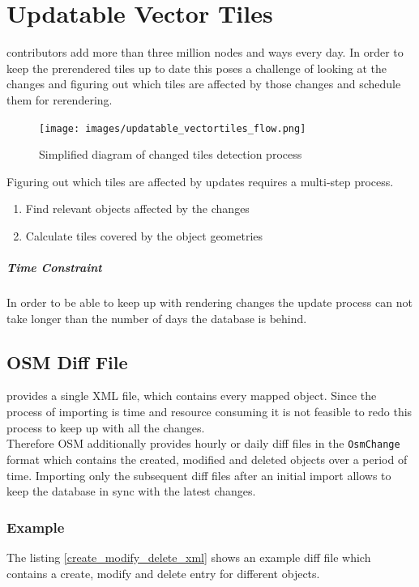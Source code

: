 \chapter{Updatable Vector Tiles}\label{chapter_updatable_vector_tiles}


\osm{} contributors add more than three million nodes and ways every day.
In order to keep the prerendered tiles up to date this poses a challenge of looking at the changes
and figuring out which tiles are affected by those changes and schedule them for rerendering.

\begin{figure}[H]
  \centering
  \texttt{[image: images/updatable\_vectortiles\_flow.png]}
  \caption{Simplified diagram of changed tiles detection process}
\end{figure}

Figuring out which tiles are affected by updates requires a multi-step process.

\begin{enumerate}
    \item Find relevant \osm{} objects affected by the changes
    \item Calculate tiles covered by the object geometries
\end{enumerate}

\paragraph{Time Constraint} In order to be able to keep up with rendering changes the update process can not take longer than the number of days the database is behind.

\section{OSM Diff File}

\osm{} provides a single XML file, which contains every mapped object. Since the process of importing is time and resource consuming it is not feasible to redo this process to keep up with all the changes. 
\\
Therefore OSM additionally provides hourly or daily diff files in the \texttt{OsmChange} format which contains the created, modified and deleted objects over a period of time. Importing only the subsequent diff files after an initial import allows to keep the database in sync with the latest changes.

\subsection*{Example}
The listing \autoref{create_modify_delete_xml} shows an example diff file which contains a create, modify and delete entry for different objects.

